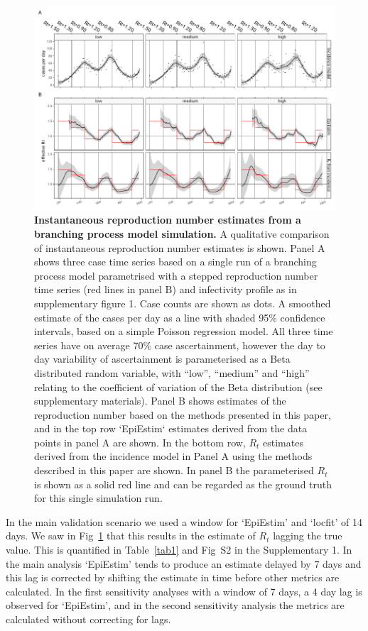 \documentclass[10pt,letterpaper]{article}
\begin{document}
\begin{figure}[!ht]
\centerline{\includegraphics{fig/fig1-noise-qualitative}}
\caption{{\bf Instantaneous reproduction number estimates from a branching process model simulation.}
A qualitative comparison of instantaneous reproduction number estimates is shown. Panel A shows three case time series based on a single run of a branching process model parametrised with a stepped reproduction number time series (red lines in panel B) and infectivity profile as in supplementary figure 1. Case counts are shown as dots. A smoothed estimate of the cases per day as a line with shaded 95\% confidence intervals, based on a simple Poisson regression model. All three time series have on average 70\% case ascertainment, however the day to day variability of ascertainment is parameterised as a Beta distributed random variable, with ``low'', ``medium'' and ``high'' relating to the coefficient of variation of the Beta distribution (see supplementary materials). Panel B shows estimates of the reproduction number based on the methods presented in this paper, and in the top row `EpiEstim` estimates derived from the data points in panel A are shown. In the bottom row, $R_t$ estimates derived from the incidence model in Panel A using the methods described in this paper are shown. In panel B the parameterised $R_t$ is shown as a solid red line and can be regarded as the ground truth for this single simulation run.}
\label{fig1}
\end{figure}

In the main validation scenario we used a window for `EpiEstim' and `locfit' of 14 days. We saw in Fig~\ref{fig1} that this results in the estimate of $R_t$ lagging the true value. This is quantified in Table~\ref{tab1} and Fig~S2 in the Supplementary 1. In the main analysis `EpiEstim' tends to produce an estimate delayed by 7 days and this lag is corrected by shifting the estimate in time before other metrics are calculated. In the first sensitivity analyses with a window of 7 days, a 4 day lag is observed for `EpiEstim', and in the second sensitivity analysis the metrics are calculated without correcting for lags.
\end{document}
